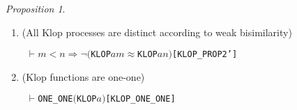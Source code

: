 \documentclass[GCNS]{yincog}
\renewcommand{\HOLConst}[1]{\texttt{#1}}
\renewcommand{\HOLFreeVar}[1]{\ensuremath{\mathit{#1}}}
\renewcommand{\HOLSymConst}[1]{#1}
\renewcommand{\HOLTokenLt}{\ensuremath{<}}
\renewcommand{\HOLTokenNeg}{\ensuremath{\neg}}
\renewcommand{\HOLTokenTurnstile}{\ensuremath{\:\:\vdash}}
\theoremstyle{remark}
\theoremstyle{theorem}
\newtheorem{proposition}[definition]{Proposition}
\theoremstyle{remark}
\newcommand{\HOLTokenWeakEQ}{$\approx$}
\renewcommand{\HOLTokenImp}{\ensuremath{\Longrightarrow}}
\begin{document}
\begin{proposition}
\begin{enumerate}
\item (All Klop processes are distinct according to weak bisimilarity)
%
\begin{alltt}
\HOLTokenTurnstile{} \HOLFreeVar{m} \HOLSymConst{\HOLTokenLt{}} \HOLFreeVar{n} \HOLSymConst{\HOLTokenImp{}} \HOLSymConst{\HOLTokenNeg{}}\ensuremath{(}\HOLConst{KLOP} \HOLFreeVar{a} \HOLFreeVar{m} \HOLSymConst{\HOLTokenWeakEQ} \HOLConst{KLOP} \HOLFreeVar{a} \HOLFreeVar{n}\ensuremath{)}\hfill{[KLOP\_PROP2']}
\end{alltt}
%
\item (Klop functions are one-one)
%
\begin{alltt}
\HOLTokenTurnstile{} \HOLConst{ONE\_ONE} \ensuremath{(}\HOLConst{KLOP} \HOLFreeVar{a}\ensuremath{)}\hfill{[KLOP\_ONE\_ONE]}
\end{alltt}
%
\end{enumerate}
%
\end{proposition}
\end{document}
